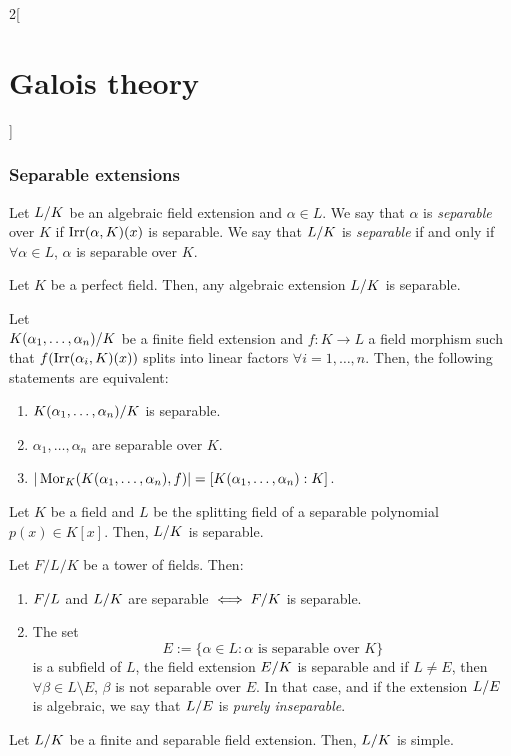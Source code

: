 \documentclass[../../../main.tex]{subfiles}
\begin{document}
\begin{multicols}{2}[\section{Galois theory}]
  \subsubsection{Separable extensions}
  \begin{definition}
    Let $\quot{L}{K}$ be an algebraic field extension and $\alpha\in L$. We say that $\alpha$ is \textit{separable} over $K$ if $\operatorname{Irr}(\alpha,K)(x)$ is separable. We say that $\quot{L}{K}$ is \textit{separable} if and only if $\forall \alpha\in L$, $\alpha$ is separable over $K$.
  \end{definition}
  \begin{corollary}
    Let $K$ be a perfect field. Then, any algebraic extension $\quot{L}{K}$ is separable.
  \end{corollary}
  \begin{theorem}
    Let\\ $\quot{K(\alpha_1,\ldots,\alpha_n)}{K}$ be a finite field extension and $f:K\rightarrow L$ a field morphism such that $f(\operatorname{Irr}(\alpha_i,K)(x))$ splits into linear factors $\forall i=1,\ldots,n$. Then, the following statements are equivalent:
    \begin{enumerate}
      \item $\quot{K(\alpha_1,\ldots,\alpha_n)}{K}$ is separable.
      \item $\alpha_1,\ldots,\alpha_n$ are separable over $K$.
      \item $|\operatorname{Mor}_K(K(\alpha_1,\ldots,\alpha_n),f)|=[K(\alpha_1,\ldots,\alpha_n):K]$.
    \end{enumerate}
  \end{theorem}
  \begin{corollary}
    Let $K$ be a field and $L$ be the splitting field of a separable polynomial $p(x)\in K[x]$. Then, $\quot{L}{K}$ is separable.
  \end{corollary}
  \begin{prop}
    Let $F/L/K$ be a tower of fields. Then:
    \begin{enumerate}
      \item $\quot{F}{L}$ and $\quot{L}{K}$ are separable $\iff\quot{F}{K}$ is separable.
      \item The set $$E:=\{\alpha\in L:\alpha\text{ is separable over }K\}$$ is a subfield of $L$, the field extension $\quot{E}{K}$ is separable and if $L\ne E$, then $\forall\beta\in L\setminus E$, $\beta$ is not separable over $E$. In that case, and if the extension $\quot{L}{E}$ is algebraic, we say that $\quot{L}{E}$ is \textit{purely inseparable}.
    \end{enumerate}
  \end{prop}
  \begin{theorem}
    Let $\quot{L}{K}$ be a finite and separable field extension. Then, $\quot{L}{K}$ is simple.
  \end{theorem}

\end{multicols}
\end{document}
